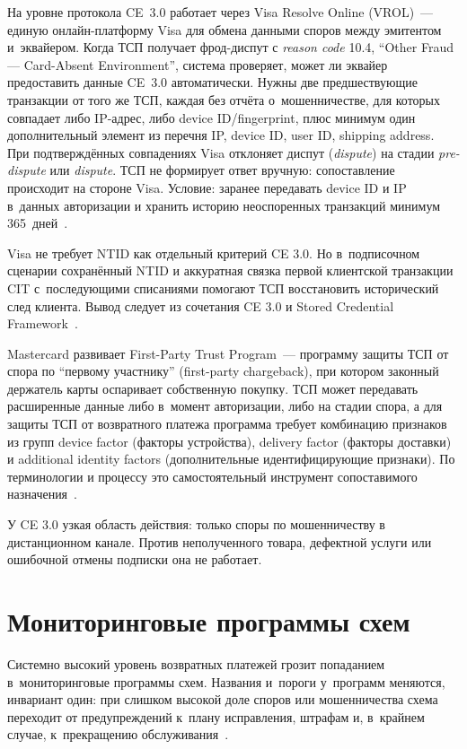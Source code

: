 На уровне протокола CE~3.0 работает через Visa Resolve Online
(VROL)~--- единую онлайн-платформу Visa для обмена данными споров
между эмитентом и~эквайером. Когда ТСП получает фрод-диспут с \textit{reason code} 10.4,
\enquote{Other Fraud --- Card-Absent Environment}, система
проверяет, может ли эквайер предоставить данные CE~3.0
автоматически. Нужны две предшествующие транзакции от того же ТСП,
каждая без отчёта о~мошенничестве, для которых совпадает либо IP-адрес,
либо device ID/fingerprint, плюс минимум один дополнительный
элемент из перечня IP, device ID, user ID, shipping address.
При подтверждённых совпадениях Visa отклоняет диспут (\textit{dispute})
на стадии \textit{pre-dispute} или \textit{dispute}. ТСП не формирует ответ вручную:
сопоставление происходит на стороне Visa. Условие: заранее передавать
device ID и IP в~данных авторизации и хранить историю
неоспоренных транзакций минимум 365~дней~\cite{visa-ce30-merchant-readiness}.

Visa не требует NTID как отдельный критерий CE 3.0. Но в~подписочном
сценарии сохранённый NTID и аккуратная связка первой клиентской транзакции
CIT с~последующими списаниями помогают ТСП восстановить
исторический след клиента. Вывод следует из сочетания CE 3.0
и Stored Credential Framework~\cite{visa-ce30-merchant-readiness,visa-scf}.

Mastercard развивает First-Party Trust Program~--- программу
защиты ТСП от спора по \enquote{первому участнику} (first-party
chargeback), при котором законный держатель карты оспаривает
собственную покупку. ТСП может передавать расширенные данные либо
в~момент авторизации, либо на стадии спора, а
для защиты ТСП от возвратного платежа программа требует комбинацию
признаков из групп device factor (факторы устройства), delivery factor
(факторы доставки) и additional identity factors (дополнительные
идентифицирующие признаки). По терминологии и процессу это
самостоятельный инструмент сопоставимого
назначения~\cite{mc-first-party-trust,mc-dispute-management}.

У CE 3.0 узкая область действия: только споры по мошенничеству в
дистанционном канале. Против неполученного товара, дефектной услуги
или ошибочной отмены подписки она не работает.

\section{Мониторинговые программы схем}\label{sec:disputes-monitoring}

Системно высокий уровень возвратных платежей грозит попаданием
в~мониторинговые программы схем. Названия и~пороги у~программ
меняются, инвариант один: при слишком высокой доле споров или
мошенничества схема переходит от предупреждений к~плану исправления,
штрафам и, в~крайнем случае, к~прекращению обслуживания~\cite{visa-core-rules,mc-chargeback-guide}.

